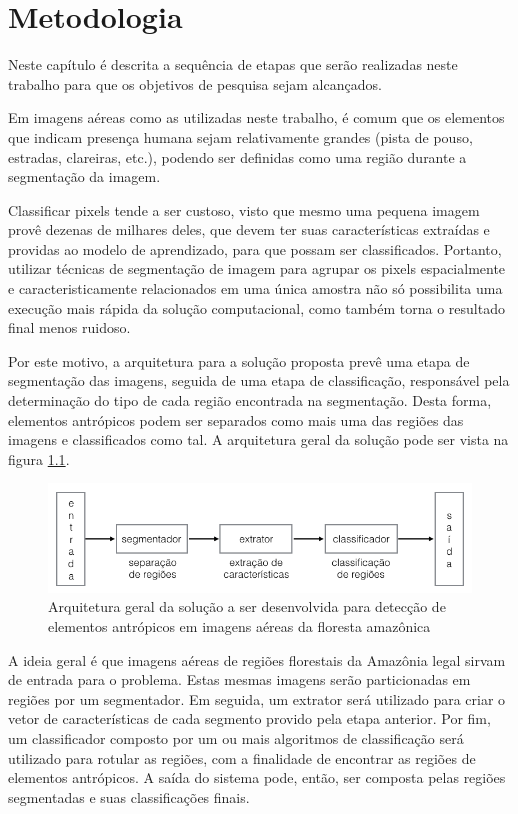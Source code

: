 \chapter{Metodologia}\label{cap:metodologia}

Neste capítulo é descrita a sequência de etapas que serão realizadas neste trabalho para que os objetivos de pesquisa sejam alcançados.

Em imagens aéreas como as utilizadas neste trabalho, é comum que os elementos que indicam presença humana sejam relativamente grandes (pista de pouso, estradas, clareiras, etc.), podendo ser definidas como uma região durante a segmentação da imagem.

Classificar pixels tende a ser custoso, visto que mesmo uma pequena imagem provê dezenas de milhares deles, que devem ter suas características extraídas e providas ao modelo de aprendizado, para que possam ser classificados. Portanto, utilizar técnicas de segmentação de imagem para agrupar os pixels espacialmente e caracteristicamente relacionados em uma única amostra não só possibilita uma execução mais rápida da solução computacional, como também torna o resultado final menos ruidoso.

Por este motivo, a arquitetura para a solução proposta prevê uma etapa de segmentação das imagens, seguida de uma etapa de classificação, responsável pela determinação do tipo de cada região encontrada na segmentação. Desta forma, elementos antrópicos podem ser separados como mais uma das regiões das imagens e classificados como tal. A arquitetura geral da solução pode ser vista na figura \ref{fig:metDiagramaGeral}.

\begin{figure}[h]
    \includegraphics[width=\textwidth]{imgs/arquitetura_geral}
    \caption{Arquitetura geral da solução a ser desenvolvida para detecção de elementos antrópicos em imagens aéreas da floresta amazônica}
    \label{fig:metDiagramaGeral}
\end{figure}

A ideia geral é que imagens aéreas de regiões florestais da Amazônia legal sirvam de entrada para o problema. Estas mesmas imagens serão particionadas em regiões por um segmentador. Em seguida, um extrator será utilizado para criar o vetor de características de cada segmento provido pela etapa anterior. Por fim, um classificador composto por um ou mais algoritmos de classificação será utilizado para rotular as regiões, com a finalidade de encontrar as regiões de elementos antrópicos. A saída do sistema pode, então, ser composta pelas regiões segmentadas e suas classificações finais.


